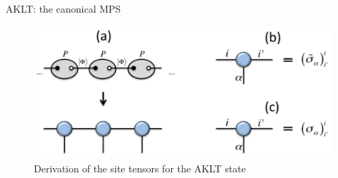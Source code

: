 \begin{frame}{AKLT: the canonical MPS}
\begin{figure}
\centering
\includegraphics[width=\textwidth]{orus-images/fig22}
\caption{Derivation of the site tensors for the AKLT state}
\end{figure}
\end{frame}